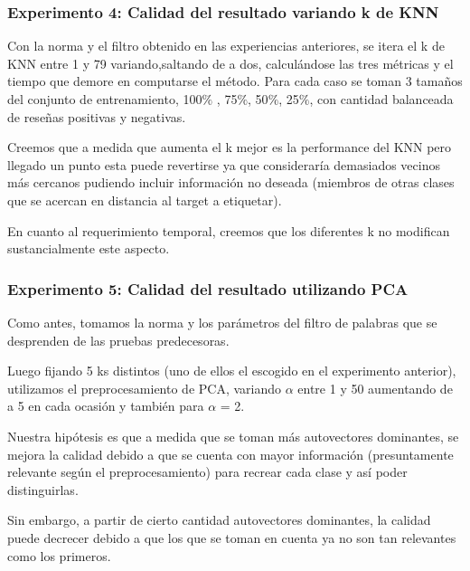 \subsubsection{Experimento 4: Calidad del resultado variando k de KNN}

Con la norma y el filtro obtenido en las experiencias anteriores, se itera el k de KNN entre 1 y 79 variando,saltando de a dos, calculándose las tres métricas y el tiempo que demore en computarse el método. Para cada caso se toman 3 tamaños del conjunto de entrenamiento, 100$\%$ , 75$\%$, 50$\%$, 25$\%$, con cantidad balanceada de reseñas positivas y negativas. 

Creemos que a medida que aumenta el k mejor es la performance del KNN  pero llegado un punto esta puede revertirse ya que consideraría demasiados vecinos más cercanos pudiendo incluir información no deseada (miembros de otras clases que se acercan en distancia al target a etiquetar). 

En cuanto al requerimiento temporal, creemos que los diferentes k no modifican sustancialmente este aspecto.

\subsubsection{Experimento 5: Calidad del resultado utilizando PCA}

Como antes, tomamos la norma y los parámetros del filtro de palabras que se desprenden de las pruebas predecesoras. 

Luego fijando 5 ks distintos (uno de ellos el escogido en el experimento anterior), utilizamos el preprocesamiento de PCA, variando $\alpha$ entre 1 y 50 aumentando de a 5 en cada ocasión y también para $\alpha$ = 2. 

Nuestra hipótesis es que a medida que se toman más autovectores dominantes, se mejora la calidad debido a que se cuenta con mayor información (presuntamente relevante según el preprocesamiento) para recrear cada clase y así poder distinguirlas. 

Sin embargo, a partir de cierto cantidad autovectores dominantes, la calidad puede decrecer debido a que los que se toman en cuenta ya no son tan relevantes como los primeros.
